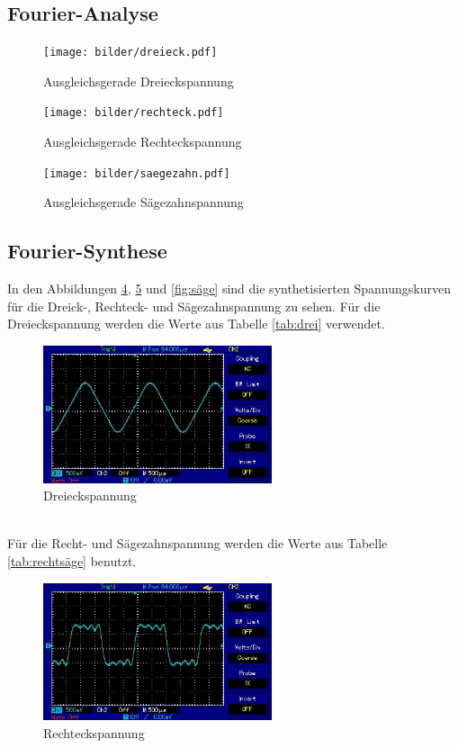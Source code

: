 \subsection{Fourier-Analyse}
\begin{figure}
  \centering
  \texttt{[image: bilder/dreieck.pdf]}
  \caption{Ausgleichsgerade Dreieckspannung}
  \label{fig:fitdrei}
\end{figure}

\begin{figure}
  \centering
  \texttt{[image: bilder/rechteck.pdf]}
  \caption{Ausgleichsgerade Rechteckspannung}
  \label{fig:fitrecht}
\end{figure}

\begin{figure}
  \centering
  \texttt{[image: bilder/saegezahn.pdf]}
  \caption{Ausgleichsgerade Sägezahnspannung}
  \label{fig:fitsäge}
\end{figure}


\subsection{Fourier-Synthese}
In den Abbildungen \ref{fig:drei}, \ref{fig:recht} und \ref{fig:säge} sind die synthetisierten
Spannungskurven für die Dreick-, Rechteck- und Sägezahnspannung zu sehen.
Für die Dreieckspannung werden die Werte aus Tabelle \ref{tab:drei} verwendet.

\begin{figure}
  \centering
  \includegraphics[width=0.6\textwidth]{bilder/dreieck.jpg}
  \caption{Dreieckspannung}
  \label{fig:drei}
\end{figure} \\

Für die Recht- und Sägezahnspannung werden die Werte aus Tabelle \ref{tab:rechtsäge}
benutzt.

\begin{figure}
  \centering
  \includegraphics[width=0.6\textwidth]{bilder/rechteck.jpg}
  \caption{Rechteckspannung}
  \label{fig:recht}
\end{figure}

